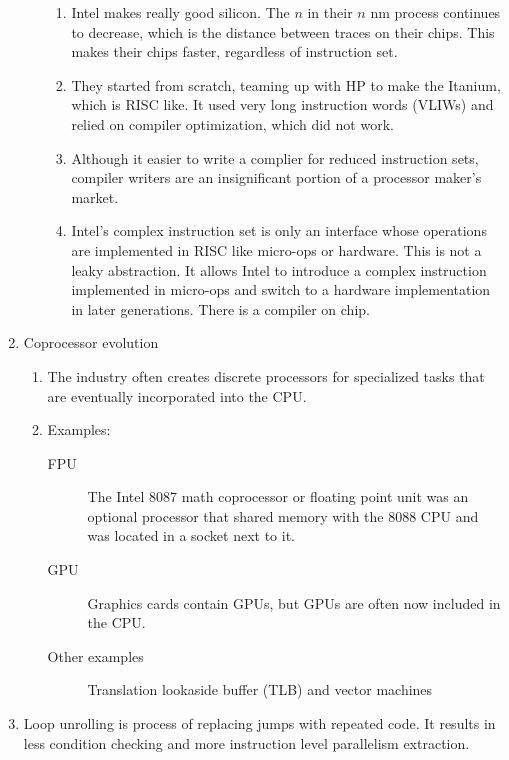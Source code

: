 \documentclass[twoside]{article}
\begin{document}
\begin{enumerate}
\begin{enumerate}
				\begin{enumerate}
					\item Intel makes really good silicon. The $n$ in their $n$ nm process continues
						to decrease, which is the distance between traces on their chips. This makes
						their chips faster, regardless of instruction set.
					\item They started from scratch, teaming up with HP to make the Itanium, which is
						RISC like. It used very long instruction words (VLIWs) and relied on compiler
						optimization, which did not work.
					\item Although it easier to write a complier for reduced instruction sets, compiler
						writers are an insignificant portion of a processor maker's market.
					\item Intel's complex instruction set is only an interface whose operations are
						implemented in RISC like micro-ops or hardware. This is not a leaky abstraction.
						It allows Intel to introduce a complex instruction implemented in micro-ops
						and switch to a hardware implementation in later generations. There is a compiler
						on chip.
				\end{enumerate}
		\end{enumerate}
	\item Coprocessor evolution
		\begin{enumerate}
			\item The industry often creates discrete processors for specialized tasks that are eventually
				incorporated into the CPU.
			\item Examples:
				\begin{description}
					\item[FPU] The Intel 8087 math coprocessor or floating point unit was an optional processor
						that shared memory with the 8088 CPU and was located in a socket next to it.
					\item[GPU] Graphics cards contain GPUs, but GPUs are often now included in the CPU.
					\item[Other examples] Translation lookaside buffer (TLB) and vector machines
				\end{description}
		\end{enumerate}
	\item Loop unrolling is process of replacing jumps with repeated code. It results in less
		condition checking and more instruction level parallelism extraction.
\end{enumerate}
\end{document}

